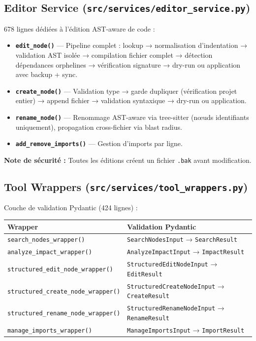 \documentclass[12pt,a4paper]{article}
\newcommand{\code}[1]{\texttt{#1}}
\begin{document}
\subsection{Editor Service (\code{src/services/editor\_service.py})}

678 lignes dédiées à l'édition AST-aware de code :

\begin{itemize}
    \item \textbf{\code{edit\_node()}} — Pipeline complet : lookup → normalisation d'indentation → validation AST isolée → compilation fichier complet → détection dépendances orphelines → vérification signature → dry-run ou application avec backup + sync.
    \item \textbf{\code{create\_node()}} — Validation type → garde dupliquer (vérification projet entier) → append fichier → validation syntaxique → dry-run ou application.
    \item \textbf{\code{rename\_node()}} — Renommage AST-aware via tree-sitter (nœuds identifiants uniquement), propagation cross-fichier via blast radius.
    \item \textbf{\code{add\_remove\_imports()}} — Gestion d'imports par ligne.
\end{itemize}

\textbf{Note de sécurité :} Toutes les éditions créent un fichier \code{.bak} avant modification.

\subsection{Tool Wrappers (\code{src/services/tool\_wrappers.py})}

Couche de validation Pydantic (424 lignes) :

\begin{center}
\begin{tabularx}{\textwidth}{lX}
\toprule
\textbf{Wrapper} & \textbf{Validation Pydantic} \\
\midrule
\code{search\_nodes\_wrapper()} & \code{SearchNodesInput} → \code{SearchResult} \\
\code{analyze\_impact\_wrapper()} & \code{AnalyzeImpactInput} → \code{ImpactResult} \\
\code{structured\_edit\_node\_wrapper()} & \code{StructuredEditNodeInput} → \code{EditResult} \\
\code{structured\_create\_node\_wrapper()} & \code{StructuredCreateNodeInput} → \code{CreateResult} \\
\code{structured\_rename\_node\_wrapper()} & \code{StructuredRenameNodeInput} → \code{RenameResult} \\
\code{manage\_imports\_wrapper()} & \code{ManageImportsInput} → \code{ImportResult} \\
\bottomrule
\end{tabularx}
\end{center}
\end{document}
